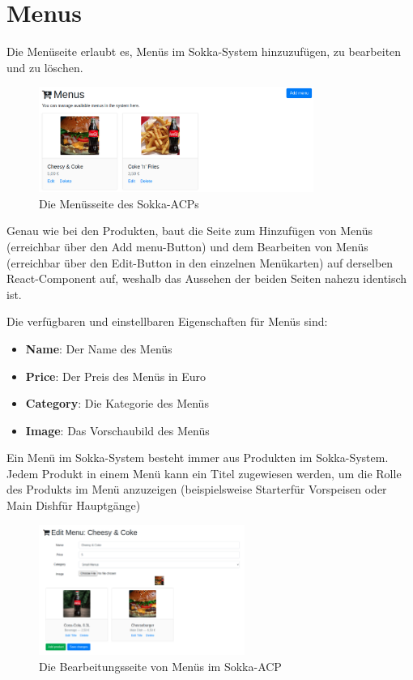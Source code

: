 \section{Menus}

Die Menüseite erlaubt es, Menüs im Sokka-System hinzuzufügen, zu bearbeiten und zu löschen.

\begin{figure}[ht]
    \centering
    \includegraphics[width=0.8\textwidth]{images/ACP/menus.png}
    \caption{Die Menüsseite des Sokka-ACPs}
\end{figure}

Genau wie bei den Produkten, baut die Seite zum Hinzufügen von Menüs (erreichbar über den \glqq Add menu\grqq -Button) und dem Bearbeiten von Menüs (erreichbar über den \glqq Edit\grqq -Button in den einzelnen Menükarten) auf derselben React-Component auf, weshalb das Aussehen der beiden Seiten nahezu identisch ist.

Die verfügbaren und einstellbaren Eigenschaften für Menüs sind:

\begin{itemize}
    \item \textbf{Name}: Der Name des Menüs
    \item \textbf{Price}: Der Preis des Menüs in Euro
    \item \textbf{Category}: Die Kategorie des Menüs
    \item \textbf{Image}: Das Vorschaubild des Menüs
\end{itemize}

Ein Menü im Sokka-System besteht immer aus Produkten im Sokka-System. Jedem Produkt in einem Menü kann ein Titel zugewiesen werden, um die Rolle des Produkts im Menü anzuzeigen (beispielsweise \glqq Starter\grqq für Vorspeisen oder \glqq Main Dish\grqq für Hauptgänge)

\begin{figure}[ht]
    \centering
    \includegraphics[width=0.6\textwidth]{images/ACP/menus_edit.png}
    \caption{Die Bearbeitungsseite von Menüs im Sokka-ACP}
\end{figure}

